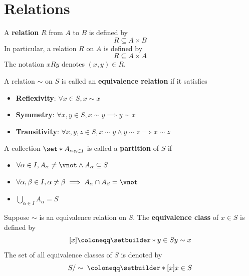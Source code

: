 \section{Relations}

\begin{definition} \label{an:def:relation}
  A \textbf{relation} $R$ from $A$ to $B$ is defined by
  \[
    R \subseteq A \times B
  \]
  In particular, a relation $R$ on $A$ is defined by
  \[
    R \subseteq A \times A
  \]
  The notation $xRy$ denotes $(x, y) \in R$.
\end{definition}

\bigskip

\begin{definition} \label{an:def:equivalence-relation}
  A relation $\sim$ on $S$ is called an \textbf{equivalence relation} if it satisfies
  \begin{itemize}
    \item \textbf{Reflexivity}: $\forall x \in S, x \sim x$
    \item \textbf{Symmetry}: $\forall x, y \in S, x \sim y \implies y \sim x$
    \item \textbf{Transitivity}: $\forall x, y, z \in S, x \sim y \land y \sim z \implies x \sim z$
  \end{itemize}
\end{definition}

\bigskip

\begin{definition} \label{an:def:partition}
  A collection $\set*{A_{\alpha}}_{\alpha \in I}$ is called a \textbf{partition} of $S$ if
  \begin{itemize}
    \item $\forall \alpha \in I, A_{\alpha} \neq \vnot \land A_{\alpha} \subseteq S$
    \item $\forall \alpha, \beta \in I, \alpha \neq \beta \implies A_{\alpha} \cap A_{\beta} = \vnot$
    \item $\bigcup_{\alpha \in I} A_{\alpha} = S$
  \end{itemize}
\end{definition}

\bigskip

\begin{definition} \label{an:def:equivalence-class}
  Suppose $\sim$ is an equivalence relation on $S$. The \textbf{equivalence class} of $x \in S$ is defined by
  \[
    [x] \coloneqq \setbuilder*{y \in S}{y \sim x}
  \]
  The set of all equivalence classes of $S$ is denoted by
  \[
    S / \sim \; \coloneqq \setbuilder*{[x]}{x \in S}
  \]
\end{definition}

